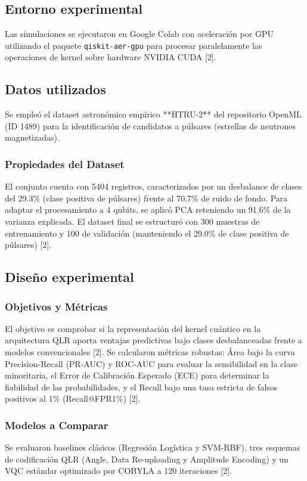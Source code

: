 \documentclass[12pt,oneside]{report}
\begin{document}
\subsection{Entorno experimental}
Las simulaciones se ejecutaron en Google Colab con aceleración por GPU utilizando el paquete \texttt{qiskit-aer-gpu} para procesar paralelamente las operaciones de kernel sobre hardware NVIDIA CUDA [2].

\subsection{Datos utilizados}
Se empleó el dataset astronómico empírico **HTRU-2** del repositorio OpenML (ID 1489) para la identificación de candidatos a púlsares (estrellas de neutrones magnetizadas).

\subsubsection{Propiedades del Dataset}
El conjunto cuenta con 5404 registros, caracterizados por un desbalance de clases del 29.3\% (clase positiva de púlsares) frente al 70.7\% de ruido de fondo. Para adaptar el procesamiento a 4 qubits, se aplicó PCA reteniendo un 91.6\% de la varianza explicada. El dataset final se estructuró con 300 muestras de entrenamiento y 100 de validación (manteniendo el 29.0\% de clase positiva de púlsares) [2].

\subsection{Diseño experimental}

\subsubsection{Objetivos y Métricas}
El objetivo es comprobar si la representación del kernel cuántico en la arquitectura QLR aporta ventajas predictivas bajo clases desbalanceadas frente a modelos convencionales [2]. Se calcularon métricas robustas: Área bajo la curva Precision-Recall (PR-AUC) y ROC-AUC para evaluar la sensibilidad en la clase minoritaria, el Error de Calibración Esperado (ECE) para determinar la fiabilidad de las probabilidades, y el Recall bajo una tasa estricta de falsos positivos al 1\% (Recall@FPR1\%) [2].

\subsubsection{Modelos a Comparar}
Se evaluaron baselines clásicos (Regresión Logística y SVM-RBF), tres esquemas de codificación QLR (Angle, Data Re-uploading y Amplitude Encoding) y un VQC estándar optimizado por COBYLA a 120 iteraciones [2].
\end{document}
